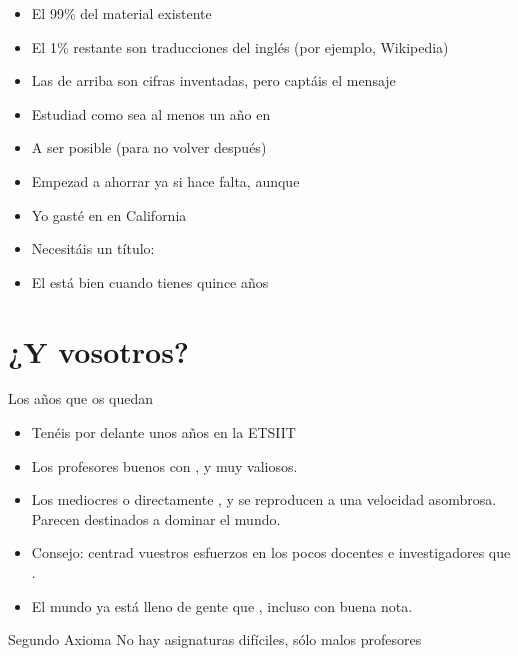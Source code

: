 \documentclass[14pt]{beamer}
\begin{document}
\begin{frame}{}
  \begin{block}{}\centering
    \Large {}
  \end{block}
  \begin{itemize}
    \item El 99\% del material existente 
    \item El 1\% restante son traducciones del inglés (por ejemplo, Wikipedia)
    \item Las de arriba son cifras inventadas, pero captáis el mensaje
    \item Estudiad como sea al menos un año en 
    \item A ser posible  (para no volver después)
    \item Empezad a ahorrar ya si hace falta, aunque 
    \item Yo gasté  en  en California
    \item Necesitáis un título: 
    \item El  está bien cuando tienes quince años
  \end{itemize}
\end{frame}

\section{¿Y vosotros?}
\begin{frame}{Los años que os quedan}
  \begin{itemize}
    \item Tenéis por delante unos años  en la ETSIIT
    \item Los profesores buenos con , y muy valiosos.
    \item Los mediocres o directamente , y
      se reproducen a una velocidad asombrosa. Parecen destinados a
      dominar el mundo.
    \item Consejo: centrad vuestros esfuerzos en los pocos docentes e
      investigadores que .
    \item El mundo ya está lleno de gente que , incluso con buena nota.
  \end{itemize}

  \begin{alertblock}{\centering Segundo Axioma}
    \centering No hay asignaturas difíciles, sólo malos profesores
  \end{alertblock}
\end{frame}
\end{document}
